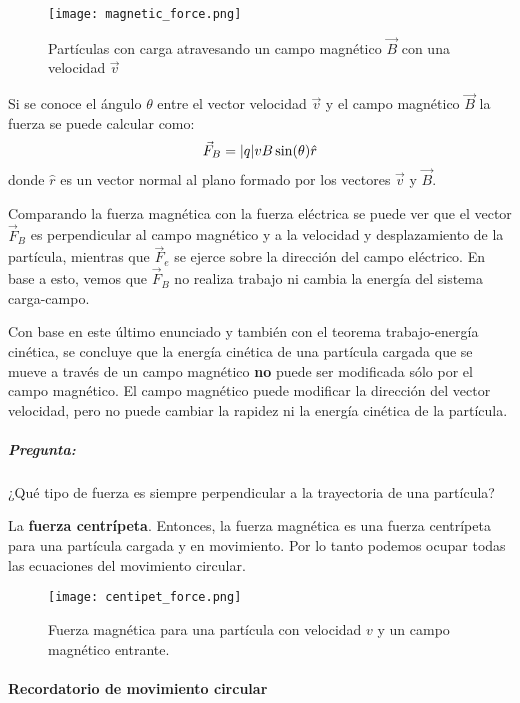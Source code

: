 \begin{figure}[ht]
  \centering
  \texttt{[image: magnetic\_force.png]}
  \caption{Partículas con carga atravesando un campo magnético \(\vec{B}\) con una velocidad \(\vec{v}\)}
\end{figure}

Si se conoce el ángulo \(\theta\) entre el vector velocidad \(\vec{v}\) y el campo magnético \(\vec{B}\) la fuerza se puede calcular como:
\[
  \vec{F}_B = \abs{q} v B \sin(\theta) \hat{r}
\]
donde \(\hat{r}\) es un vector normal al plano formado por los vectores \(\vec{v}\) y \(\vec{B}\). 

Comparando la fuerza magnética con la fuerza eléctrica se puede ver que el vector \(\vec{F}_B\) es perpendicular al campo magnético y a la velocidad y desplazamiento de la partícula, mientras que \(\vec{F}_e\) se ejerce sobre la dirección del campo eléctrico. En base a esto, vemos que \(\vec{F}_B\) no realiza trabajo ni cambia la energía del sistema carga-campo. 

\begin{tcolorbox}[myconclusion]
  Con base en este último enunciado y también con el teorema trabajo-energía cinética, se concluye que la energía cinética de una partícula cargada que se mueve a través de un campo magnético \textbf{no} puede ser modificada sólo por el campo magnético. El campo magnético puede modificar la dirección del vector velocidad, pero no puede cambiar la rapidez ni la energía cinética de la partícula.
\end{tcolorbox}

\subparagraph{Pregunta:}

\noindent ¿Qué tipo de fuerza es siempre perpendicular a la trayectoria de una partícula?

\vspace{3pt}

\noindent La \textbf{fuerza centrípeta}. Entonces, la fuerza magnética es una fuerza centrípeta para una partícula cargada y en movimiento. Por lo tanto podemos ocupar todas las ecuaciones del movimiento circular.

\begin{figure}[ht]
  \centering
  \texttt{[image: centipet\_force.png]}
  \caption{Fuerza magnética para una partícula con velocidad \(v\) y un campo magnético entrante.}
  \label{fig:centripet_force}
\end{figure}

\paragraph{Recordatorio de movimiento circular}

